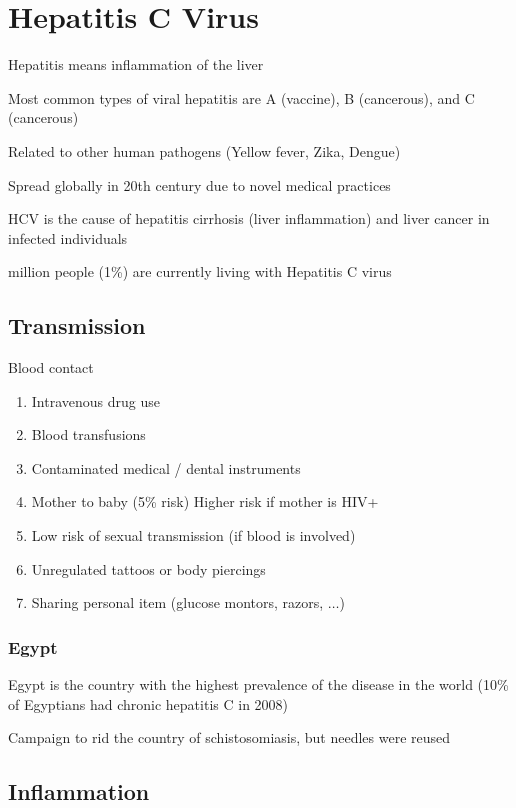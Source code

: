 \documentclass{notes}
\begin{document}
\section{Hepatitis C Virus}

Hepatitis means inflammation of the liver

\tab Most common types of viral hepatitis are A (vaccine), B (cancerous), and C (cancerous)

Related to other human pathogens (Yellow fever, Zika, Dengue)

\tab Spread globally in 20th century due to novel medical practices

HCV is the cause of hepatitis cirrhosis (liver inflammation) and liver cancer in infected individuals

 million people (1\%) are currently living with Hepatitis C virus

\subsection{Transmission}

Blood contact

\begin{enumerate}
    \item Intravenous drug use
    \item Blood transfusions
    \item Contaminated medical / dental instruments
    \item Mother to baby (5\% risk)
    \subitem Higher risk if mother is HIV+
    \item Low risk of sexual transmission (if blood is involved)
    \item Unregulated tattoos or body piercings
    \item Sharing personal item (glucose montors, razors, \(\dots\))
\end{enumerate}

\subsubsection{Egypt}

Egypt is the country with the highest prevalence of the disease in the world (10\% of Egyptians had chronic hepatitis C in 2008)

Campaign to rid the country of schistosomiasis, but needles were reused

\subsection{Inflammation}
\end{document}
